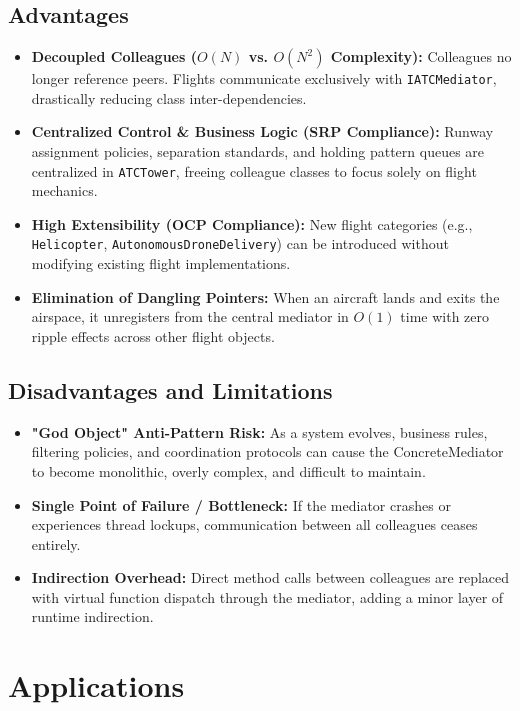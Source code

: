\documentclass[12pt,a4paper]{article}
\begin{document}
\subsection{Advantages}
\begin{itemize}
    \item \textbf{Decoupled Colleagues ($O(N)$ vs. $O(N^2)$ Complexity):} Colleagues no longer reference peers. Flights communicate exclusively with \texttt{IATCMediator}, drastically reducing class inter-dependencies.
    \item \textbf{Centralized Control \& Business Logic (SRP Compliance):} Runway assignment policies, separation standards, and holding pattern queues are centralized in \texttt{ATCTower}, freeing colleague classes to focus solely on flight mechanics.
    \item \textbf{High Extensibility (OCP Compliance):} New flight categories (e.g., \texttt{Helicopter}, \texttt{AutonomousDroneDelivery}) can be introduced without modifying existing flight implementations.
    \item \textbf{Elimination of Dangling Pointers:} When an aircraft lands and exits the airspace, it unregisters from the central mediator in $O(1)$ time with zero ripple effects across other flight objects.
\end{itemize}

\subsection{Disadvantages and Limitations}
\begin{itemize}
    \item \textbf{"God Object" Anti-Pattern Risk:} As a system evolves, business rules, filtering policies, and coordination protocols can cause the ConcreteMediator to become monolithic, overly complex, and difficult to maintain.
    \item \textbf{Single Point of Failure / Bottleneck:} If the mediator crashes or experiences thread lockups, communication between all colleagues ceases entirely.
    \item \textbf{Indirection Overhead:} Direct method calls between colleagues are replaced with virtual function dispatch through the mediator, adding a minor layer of runtime indirection.
\end{itemize}

\section{Applications}
\end{document}
